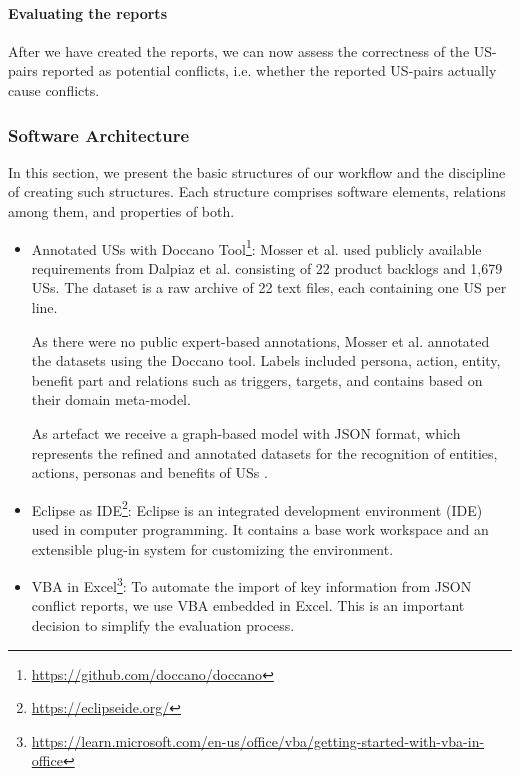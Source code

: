 \paragraph{Evaluating the reports} After we have created the reports, we can now assess the correctness of the US-pairs reported as potential conflicts, i.e. whether the reported US-pairs actually cause conflicts.
\subsubsection*{Software Architecture}\label{conflict_architectur}
In this section, we present the basic structures of our workflow and the discipline of creating such structures. Each structure comprises software elements, relations among them, and properties of both.
\begin{itemize}
	\item Annotated USs with Doccano Tool\footnote{\href{https://github.com/doccano/doccano}{https://github.com/doccano/doccano}}: Mosser et al. used publicly available requirements from Dalpiaz et al. \cite{Dalpiaz2018} consisting of 22 product backlogs and 1,679 USs. The dataset is a raw archive of 22 text files, each containing one US per line. 
	
	As there were no public expert-based annotations, Mosser et al. annotated the datasets using the Doccano tool. Labels included persona, action, entity, benefit part and relations such as triggers, targets, and contains based on their domain meta-model.
	
	As artefact we receive a graph-based model with JSON format, which represents the refined and annotated datasets for the recognition of entities, actions, personas and benefits of USs \cite{mosser2022modelling}.
	
	\item Eclipse as IDE\footnote{\href{https://eclipseide.org/}{https://eclipseide.org/}}: Eclipse is an integrated development environment (IDE) used in computer programming. It contains a base work workspace and an extensible plug-in system for customizing the environment.
	
	
	\item VBA in Excel\footnote{\href{https://learn.microsoft.com/en-us/office/vba/library-reference/concepts/getting-started-with-vba-in-office}{https://learn.microsoft.com/en-us/office/vba/getting-started-with-vba-in-office}}: To automate the import of key information from JSON conflict reports, we use VBA embedded in Excel. This is an important decision to simplify the evaluation process.
	

\end{itemize}
